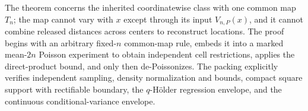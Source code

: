 The theorem concerns the inherited coordinatewise class with one common map \(T_n\); the map cannot vary with \(x\) except through its input \(V_{n,P}(x)\), and it cannot combine released distances across centers to reconstruct locations.  The proof begins with an arbitrary fixed-\(n\) common-map rule, embeds it into a marked mean-\(2n\) Poisson experiment to obtain independent cell restrictions, applies the direct-product bound, and only then de-Poissonizes.  The packing explicitly verifies independent sampling, density normalization and bounds, compact square support with rectifiable boundary, the \(q\)-H\"older regression envelope, and the continuous conditional-variance envelope.